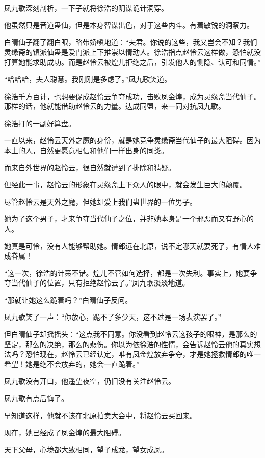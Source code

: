 \begin{this_body}
凤九歌深刻剖析，一下子就将徐浩的阴谋诡计洞穿。

他虽然只是音道蛊仙，但是本身智谋出色，对于这些内斗。有着敏锐的洞察力。

白晴仙子翻了翻白眼，略带娇嗔地道：“夫君。你说的这些，我又岂会不知？我们灵缘斋的镇派仙蛊是爱门派上下推崇以情动人。徐浩指点赵怜云这样做，恐怕就没打算她能求助成功。而是赵怜云被煌儿拒绝之后，引发他人的恻隐、认可和同情。”

“哈哈哈，夫人聪慧。我刚刚是多虑了。”凤九歌笑道。

徐浩千方百计，也想要促成赵怜云争夺成功，击败凤金煌，成为灵缘斋当代仙子。那样的话，他就能借助赵怜云的力量。达成同盟，来一同对抗凤九歌。

徐浩打的一副好算盘。

一直以来，赵怜云天外之魔的身份，就是她竞争灵缘斋当代仙子的最大阻碍。因为本土的人，自然更愿意相信和他们一样出身的同类。

而来自外世界的赵怜云，很自然就遭到了排除和猜疑。

但经此一事，赵怜云的形象在灵缘斋上下众人的眼中，就会发生巨大的颠覆。

尽管赵怜云是天外之魔，但她却爱上我们蛊世界的一位男子。

她为了这个男子，才来争夺当代仙子之位，并非她本身是一个邪恶而又有野心的人。

她真是可怜，没有人能够帮助她。情郎远在北原，说不定哪天就要死了，有情人难成眷属！

“这一次，徐浩的计策不错。煌儿不管如何选择，都是一次失利。事实上，她要争夺当代仙子的位置，只有拒绝赵怜云了。”凤九歌淡淡地道。

“那就让她这么跪着吗？”白晴仙子反问。

凤九歌笑了一声：“你放心，跪不了多少天，这不过是一场表演罢了。”

但白晴仙子却摇摇头：“这点我不同意。你没看到赵怜云这孩子的眼神，是那么的坚定，那么的决绝，那么的悲伤。你以为依徐浩的性情，会告诉赵怜云他的真实想法吗？恐怕现在，赵怜云已经认定，唯有凤金煌放弃争夺，才是她拯救情郎的唯一希望！她是绝不会放弃的，她会一直跪着。”

凤九歌没有开口，他遥望夜空，仍旧没有关注赵怜云。

凤九歌有点后悔了。

早知道这样，他就不该在北原拍卖大会中，将赵怜云买回来。

现在，她已经成了凤金煌的最大阻碍。

天下父母，心境都大致相同，望子成龙，望女成凤。


\end{this_body}
